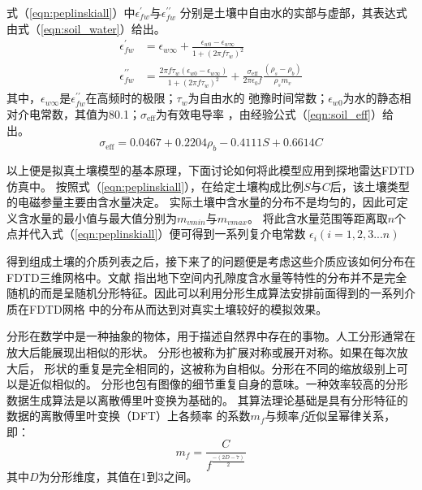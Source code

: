 式（\ref{eqn:peplinskiall}）中$\epsilon_{f w}^{\prime}$与$\epsilon_{f w}^{\prime \prime}$
分别是土壤中自由水的实部与虚部，其表达式由式（\ref{eqn:soil_water}）给出。
\begin{equation} 
	\label{eqn:soil_water}
	\begin{aligned}
		\epsilon_{f w}^{\prime}&=\epsilon_{w \infty}+\frac{\epsilon_{w 0}-\epsilon_{w \infty}}{1+\left(2 \pi f \tau_{w}\right)^{2}} \\
		\epsilon_{f w}^{\prime \prime}&=\frac{2 \pi f \tau_{w}\left(\epsilon_{w 0}-\epsilon_{w \infty}\right)}{1+\left(2 \pi f \tau_{w}\right)^{2}}+\frac{\sigma_{\mathrm{eff}}}{2 \pi \epsilon_{0} f} \frac{\left(\rho_{s}-\rho_{b}\right)}{\rho_{s} m_{v}}
	\end{aligned}
\end{equation}
其中，$\epsilon_{w \infty}$是$\epsilon_{f w}^{\prime \prime}$在高频时的极限；$\tau_{w}$为自由水的
弛豫时间常数；$\epsilon_{w 0}$为水的静态相对介电常数，其值为80.1；$\sigma_{\mathrm{eff}}$为有效电导率
，由经验公式（\ref{eqn:soil_eff}）给出。
\begin{equation}
	\label{eqn:soil_eff}
\sigma_{\mathrm{eff}}=0.0467+0.2204 \rho_{b}-0.4111 S+0.6614 C
\end{equation}

以上便是拟真土壤模型的基本原理，下面讨论如何将此模型应用到探地雷达FDTD仿真中。
按照式（\ref{eqn:peplinskiall}），在给定土壤构成比例$S$与$C$后，该土壤类型的电磁参量主要由含水量决定。
实际土壤中含水量的分布不是均匀的，因此可定义含水量的最小值与最大值分别为$m_{vmin}$与$m_{vmax}$。
将此含水量范围等距离取$n$个点并代入式（\ref{eqn:peplinskiall}）便可得到一系列复介电常数
$\epsilon_i(i=1,2,3...n)$ 

得到组成土壤的介质列表之后，接下来了的问题便是考虑这些介质应该如何分布在FDTD三维网格中。文献
\cite{turcotte1997fractals}
指出地下空间内孔隙度含水量等特性的分布并不是完全随机的而是呈随机分形特征。因此可以利用分形生成算法安排前面得到的一系列介质在FDTD网格
中的分布从而达到对真实土壤较好的模拟效果。

分形在数学中是一种抽象的物体，用于描述自然界中存在的事物。人工分形通常在放大后能展现出相似的形状。 
分形也被称为扩展对称或展开对称。如果在每次放大后，
形状的重复是完全相同的，这被称为自相似。分形在不同的缩放级别上可以是近似相似的。 
分形也包有图像的细节重复自身的意味。一种效率较高的分形数据生成算法是以离散傅里叶变换为基础的。
其算法理论基础是具有分形特征的数据的离散傅里叶变换（DFT）上各频率
的系数$m_f$与频率$f$近似呈幂律关系，即：
\begin{equation}
m_f = \frac{C}{f^{\frac{-(2 D-7)}{2}}}
\end{equation}
其中$D$为分形维度，其值在1到3之间。

